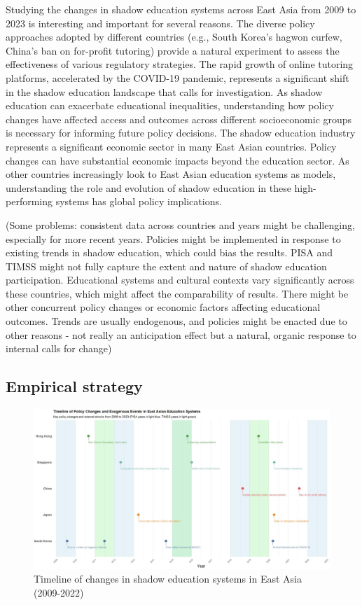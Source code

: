\documentclass[12pt,a4paper,onecolumn]{article}
\numberwithin{equation}{section}
\begin{document}
Studying the changes in shadow education systems across East Asia from 2009 to 2023 is interesting and important for several reasons. The diverse policy approaches adopted by different countries (e.g., South Korea's hagwon curfew, China's ban on for-profit tutoring) provide a natural experiment to assess the effectiveness of various regulatory strategies. The rapid growth of online tutoring platforms, accelerated by the COVID-19 pandemic, represents a significant shift in the shadow education landscape that calls for investigation. As shadow education can exacerbate educational inequalities, understanding how policy changes have affected access and outcomes across different socioeconomic groups is necessary for informing future policy decisions. The shadow education industry represents a significant economic sector in many East Asian countries. Policy changes can have substantial economic impacts beyond the education sector. As other countries increasingly look to East Asian education systems as models, understanding the role and evolution of shadow education in these high-performing systems has global policy implications.

(Some problems: consistent data across countries and years might be challenging, especially for more recent years. Policies might be implemented in response to existing trends in shadow education, which could bias the results. PISA and TIMSS might not fully capture the extent and nature of shadow education participation. Educational systems and cultural contexts vary significantly across these countries, which might affect the comparability of results. There might be other concurrent policy changes or economic factors affecting educational outcomes. Trends are usually endogenous, and policies might be enacted due to other reasons - not really an anticipation effect but a natural, organic response to internal calls for change)


\subsection{Empirical strategy}

\begin{figure}[htbp]
    \centering
    \begin{sideways}
        \includegraphics[width=1\textheight]{Capture.JPG}
    \end{sideways}
    \caption{Timeline of changes in shadow education systems in East Asia (2009-2022)}
    \label{fig:timeline}
\end{figure}
\end{document}
